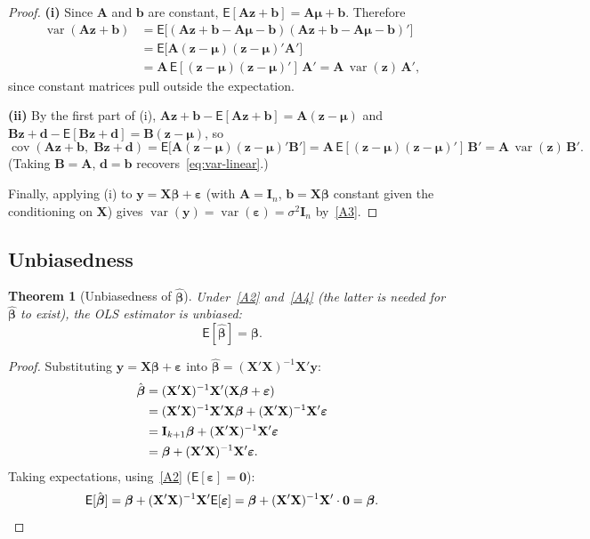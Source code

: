 \documentclass[14pt]{extarticle}
\theoremstyle{plain}
\newtheorem{theorem}{Theorem}[section]
\theoremstyle{definition}
\theoremstyle{remark}
\newcommand\expc{\mathsf{E}}
\DeclareMathOperator\var{var}
\DeclareMathOperator\cov{cov}
\newcommand{\bX}{\mathbf{X}}
\newcommand{\by}{\mathbf{y}}
\def\bb{\boldsymbol{\beta}}
\newcommand{\be}{\boldsymbol{\varepsilon}}
\newcommand{\bI}{\mathbf{I}}
\newcommand{\bzero}{\mathbf{0}}
\newcommand{\bz}{\mathbf{z}}
\newcommand{\bA}{\mathbf{A}}
\begin{document}
\begin{proof}
\textbf{(i)} Since $\bA$ and $\mathbf{b}$ are constant, $\expc[\bA\bz + \mathbf{b}] = \bA\boldsymbol\mu + \mathbf{b}$. Therefore
\begin{align*}
\var(\bA\bz + \mathbf{b}) &= \expc\bigl[(\bA\bz + \mathbf{b} - \bA\boldsymbol\mu - \mathbf{b})(\bA\bz + \mathbf{b} - \bA\boldsymbol\mu - \mathbf{b})'\bigr]\\
&= \expc\bigl[\bA(\bz - \boldsymbol\mu)(\bz - \boldsymbol\mu)'\bA'\bigr]\\
&= \bA\,\expc[(\bz - \boldsymbol\mu)(\bz - \boldsymbol\mu)']\,\bA' = \bA\,\var(\bz)\,\bA',
\end{align*}
since constant matrices pull outside the expectation.

\textbf{(ii)} By the first part of (i), $\bA\bz + \mathbf{b} - \expc[\bA\bz + \mathbf{b}] = \bA(\bz - \boldsymbol\mu)$ and $\mathbf{B}\bz + \mathbf{d} - \expc[\mathbf{B}\bz + \mathbf{d}] = \mathbf{B}(\bz - \boldsymbol\mu)$, so
\[
\cov(\bA\bz + \mathbf{b},\; \mathbf{B}\bz + \mathbf{d}) = \expc\bigl[\bA(\bz - \boldsymbol\mu)(\bz - \boldsymbol\mu)'\mathbf{B}'\bigr] = \bA\,\expc[(\bz - \boldsymbol\mu)(\bz - \boldsymbol\mu)']\,\mathbf{B}' = \bA\,\var(\bz)\,\mathbf{B}'.
\]
(Taking $\mathbf{B} = \bA$, $\mathbf{d} = \mathbf{b}$ recovers~\eqref{eq:var-linear}.)

Finally, applying (i) to $\by = \bX\bb + \be$ (with $\bA = \bI_n$, $\mathbf{b} = \bX\bb$ constant given the conditioning on $\bX$) gives $\var(\by) = \var(\be) = \sigma^2\bI_n$ by~\ref{A3}.
\end{proof}

\subsection{Unbiasedness}

\begin{theorem}[Unbiasedness of $\hat{\bb}$]\label{thm:unbiased}
Under~\ref{A2} and~\ref{A4} (the latter is needed for $\hat{\bb}$ to exist), the OLS estimator is unbiased:
\begin{equation}
\boxed{\expc[\hat{\bb}] = \bb.}
\end{equation}
\end{theorem}

\begin{proof}
Substituting $\by = \bX\bb + \be$ into $\hat{\bb} = (\bX'\bX)^{-1}\bX'\by$:
\begin{align}
\hat{\bb} &= (\bX'\bX)^{-1}\bX'(\bX\bb + \be) \notag\\
&= (\bX'\bX)^{-1}\bX'\bX\bb + (\bX'\bX)^{-1}\bX'\be \notag\\
&= \bI_{k+1}\bb + (\bX'\bX)^{-1}\bX'\be \notag\\
&= \bb + (\bX'\bX)^{-1}\bX'\be. \label{eq:beta-decomp}
\end{align}
Taking expectations, using~\ref{A2} ($\expc[\be] = \bzero$):
\[
\expc[\hat{\bb}] = \bb + (\bX'\bX)^{-1}\bX'\expc[\be] = \bb + (\bX'\bX)^{-1}\bX' \cdot \bzero = \bb. \qedhere
\]
\end{proof}
\end{document}
